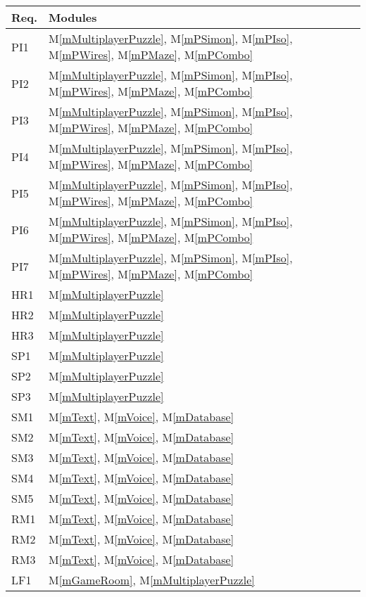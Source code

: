 \documentclass[12pt, titlepage]{article}
\newcommand{\mref}[1]{M\ref{#1}}
\begin{document}
\begin{table}[H]
\centering
\begin{tabular}{p{} p{}}
\toprule
\textbf{Req.} & \textbf{Modules}\\
\midrule
PI1 & \mref{mMultiplayerPuzzle}, \mref{mPSimon}, \mref{mPIso}, \mref{mPWires}, \mref{mPMaze},  \mref{mPCombo} \\
PI2 & \mref{mMultiplayerPuzzle}, \mref{mPSimon}, \mref{mPIso}, \mref{mPWires}, \mref{mPMaze},  \mref{mPCombo}\\
PI3 & \mref{mMultiplayerPuzzle}, \mref{mPSimon}, \mref{mPIso}, \mref{mPWires}, \mref{mPMaze},  \mref{mPCombo}\\
PI4 & \mref{mMultiplayerPuzzle}, \mref{mPSimon}, \mref{mPIso}, \mref{mPWires}, \mref{mPMaze}, \mref{mPCombo}\\
PI5 & \mref{mMultiplayerPuzzle}, \mref{mPSimon}, \mref{mPIso}, \mref{mPWires}, \mref{mPMaze},  \mref{mPCombo}\\
PI6 & \mref{mMultiplayerPuzzle}, \mref{mPSimon}, \mref{mPIso}, \mref{mPWires}, \mref{mPMaze},  \mref{mPCombo}\\
PI7 & \mref{mMultiplayerPuzzle}, \mref{mPSimon}, \mref{mPIso}, \mref{mPWires}, \mref{mPMaze}, \mref{mPCombo}\\
HR1 & \mref{mMultiplayerPuzzle}\\
HR2 & \mref{mMultiplayerPuzzle}\\
HR3 & \mref{mMultiplayerPuzzle}\\
SP1 & \mref{mMultiplayerPuzzle}\\
SP2 & \mref{mMultiplayerPuzzle}\\
SP3 & \mref{mMultiplayerPuzzle}\\
SM1 & \mref{mText}, \mref{mVoice}, \mref{mDatabase}\\
SM2 & \mref{mText}, \mref{mVoice}, \mref{mDatabase}\\
SM3 & \mref{mText}, \mref{mVoice}, \mref{mDatabase}\\
SM4 & \mref{mText}, \mref{mVoice}, \mref{mDatabase}\\
SM5 & \mref{mText}, \mref{mVoice}, \mref{mDatabase}\\
RM1 & \mref{mText}, \mref{mVoice}, \mref{mDatabase}\\
RM2 & \mref{mText}, \mref{mVoice}, \mref{mDatabase}\\
RM3 & \mref{mText}, \mref{mVoice}, \mref{mDatabase}\\
LF1 & \mref{mGameRoom}, \mref{mMultiplayerPuzzle}\\

\end{tabular}
\end{table}
\end{document}
